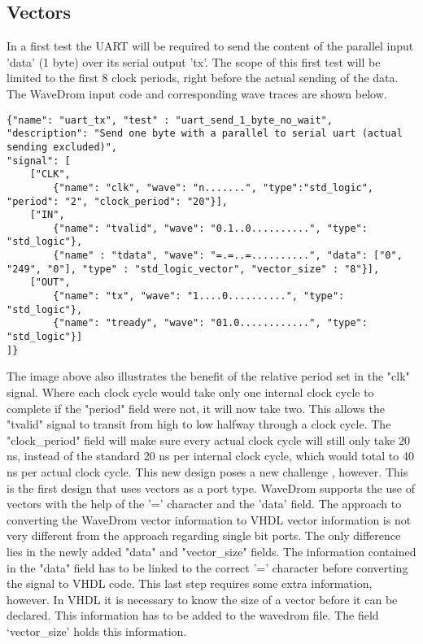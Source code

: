 \subsection{Vectors}
In a first test the UART will be required to send the content of the parallel input 'data' (1 byte) over its serial output 'tx'. The scope of this first test will be limited to the first 8 clock periods, right before the actual sending of the data. The WaveDrom input code and corresponding wave traces are shown below.
\begin{lstlisting}[style=json, caption={Source file for creating the first transmission test for the UART design in \ref{appendix:uart}}, label={json:uart_no_wait}]
{"name": "uart_tx", "test" : "uart_send_1_byte_no_wait", 
"description": "Send one byte with a parallel to serial uart (actual sending excluded)", 
"signal": [
	["CLK",
		{"name": "clk", "wave": "n.......", "type":"std_logic", "period": "2", "clock_period": "20"}],
	["IN",
		{"name": "tvalid", "wave": "0.1..0..........", "type": "std_logic"},
		{"name" : "tdata", "wave": "=.=..=..........", "data": ["0", "249", "0"], "type" : "std_logic_vector", "vector_size" : "8"}],
	["OUT",
		{"name": "tx", "wave": "1....0..........", "type": "std_logic"},
		{"name": "tready", "wave": "01.0............", "type": "std_logic"}]
]}
\end{lstlisting}\noindent
{}\newpage\noindent
The image above also illustrates the benefit of the relative period set in the "clk" signal. Where each clock cycle would take only one internal clock cycle to complete if the "period" field were not, it will now take two. This allows the "tvalid" signal to transit from high to low halfway through a clock cycle. The "clock\_period" field will make sure every actual clock cycle will still only take 20 ns, instead of the standard 20 ns per internal clock cycle, which would total to 40 ns per actual clock cycle. 
\npar
This new design poses a new challenge , however. This is the first design that uses vectors as a port type. WaveDrom supports the use of vectors with the help of the '=' character and the 'data' field. The approach to converting the WaveDrom vector information to VHDL vector information is not very different from the approach regarding single bit ports. The only difference lies in the newly added "data" and "vector\_size" fields. The information contained in the "data" field has to be linked to the correct '=' character before converting the signal to VHDL code. This last step requires some extra information, however. In VHDL it is necessary to know the size of a vector before it can be declared. This information has to be added to the wavedrom file. The field ‘vector\_size’ holds this information.
\newpage
